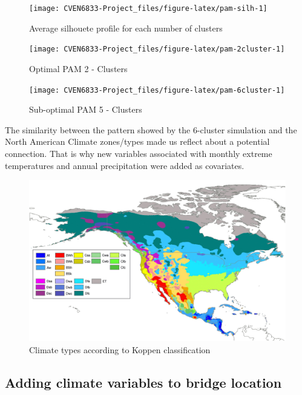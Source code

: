 \documentclass[]{book}
\theoremstyle{definition}
\theoremstyle{definition}
\theoremstyle{definition}
\theoremstyle{remark}
\begin{document}
\begin{figure}

{\centering \texttt{[image: CVEN6833-Project\_files/figure-latex/pam-silh-1]} 

}

\caption{Average silhouete profile for each number of clusters}\label{fig:pam-silh}
\end{figure}\begin{figure}

{\centering \texttt{[image: CVEN6833-Project\_files/figure-latex/pam-2cluster-1]} 

}

\caption{Optimal PAM 2 - Clusters}\label{fig:pam-2cluster}
\end{figure}\begin{figure}

{\centering \texttt{[image: CVEN6833-Project\_files/figure-latex/pam-6cluster-1]} 

}

\caption{Sub-optimal PAM 5 - Clusters}\label{fig:pam-6cluster}
\end{figure}

The similarity between the pattern showed by the 6-cluster simulation
and the North American Climate zones/types made us reflect about a
potential connection. That is why new variables associated with monthly
extreme temperatures and annual precipitation were added as covariates.

\begin{figure}
\centering
\includegraphics{North_America.jpg}
\caption{Climate types according to Koppen classification}
\end{figure}

\subsection{Adding climate variables to bridge
location}\label{adding-climate-variables-to-bridge-location}
\end{document}

